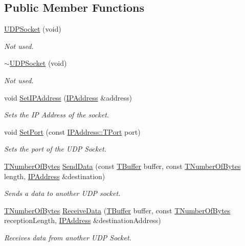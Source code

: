 \subsection*{Public Member Functions}
\begin{DoxyCompactItemize}
\item 
\hyperlink{class_u_d_p_socket_a237d16ccc7a9c4aefa81f69774748791}{U\-D\-P\-Socket} (void)
\begin{DoxyCompactList}\small\item\em Not used. \end{DoxyCompactList}\item 
\hyperlink{class_u_d_p_socket_aa5c869eca5bab38df89f09ac79f54afb}{$\sim$\-U\-D\-P\-Socket} (void)
\begin{DoxyCompactList}\small\item\em Not used. \end{DoxyCompactList}\item 
void \hyperlink{class_u_d_p_socket_a28960551bca2099a03ad6fa39ef28065}{Set\-I\-P\-Address} (\hyperlink{class_i_p_address}{I\-P\-Address} \&address)
\begin{DoxyCompactList}\small\item\em Sets the I\-P Address of the socket. \end{DoxyCompactList}\item 
void \hyperlink{class_u_d_p_socket_a13165df1eb017e8ba2eba43a06a083ec}{Set\-Port} (const \hyperlink{class_i_p_address_a51188195685c31d4258c0a078cc37154}{I\-P\-Address\-::\-T\-Port} port)
\begin{DoxyCompactList}\small\item\em Sets the port of the U\-D\-P Socket. \end{DoxyCompactList}\item 
\hyperlink{class_socket_base_ac414903631491453b96e71c06c2c2e72}{T\-Number\-Of\-Bytes} \hyperlink{class_u_d_p_socket_ab78ab0104e1fafc5feb1b3459e537e32}{Send\-Data} (const \hyperlink{class_socket_base_a1557d64029a25c20b4c306b80efcc143}{T\-Buffer} buffer, const \hyperlink{class_socket_base_ac414903631491453b96e71c06c2c2e72}{T\-Number\-Of\-Bytes} length, \hyperlink{class_i_p_address}{I\-P\-Address} \&destination)
\begin{DoxyCompactList}\small\item\em Sends a data to another U\-D\-P socket. \end{DoxyCompactList}\item 
\hyperlink{class_socket_base_ac414903631491453b96e71c06c2c2e72}{T\-Number\-Of\-Bytes} \hyperlink{class_u_d_p_socket_a4f70d5a5bf2bb16fdd897355bb80741b}{Receive\-Data} (\hyperlink{class_socket_base_a1557d64029a25c20b4c306b80efcc143}{T\-Buffer} buffer, const \hyperlink{class_socket_base_ac414903631491453b96e71c06c2c2e72}{T\-Number\-Of\-Bytes} reception\-Length, \hyperlink{class_i_p_address}{I\-P\-Address} \&destination\-Address)
\begin{DoxyCompactList}\small\item\em Receives data from another U\-D\-P Socket. \end{DoxyCompactList}\end{DoxyCompactItemize}
